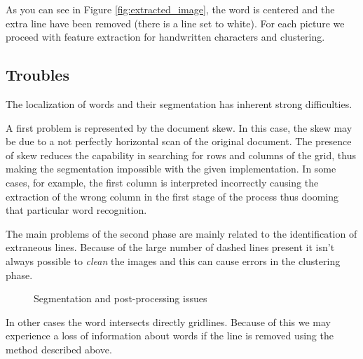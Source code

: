 As you can see in Figure \ref{fig:extracted_image}, the word is centered and the extra line have been removed (there is a line set to white). For each picture we proceed with feature extraction for handwritten characters and clustering. 

\subsection{Troubles}

The localization of words and their segmentation has inherent strong difficulties.

A first problem is represented by the document skew. In this case, the skew may be due to a not perfectly horizontal scan of the original document. The presence of skew reduces the capability in searching for rows and columns of the grid, thus making the segmentation impossible with the given implementation. In some cases, for example, the first column is interpreted incorrectly causing the extraction of the wrong column in the first stage of the process thus dooming that particular word recognition.

The main problems of the second phase are mainly related to the identification of extraneous lines. Because of the large number of dashed lines present it isn't always possible to \emph{clean} the images and this can cause errors in the clustering phase.

\begin{figure}[!ht]
 \centering
 \hspace{5mm}
 \caption{Segmentation and post-processing issues}
 \end{figure}

In other cases the word intersects directly gridlines. Because of this we may experience a loss of information about words if the line is removed using the method described above.

